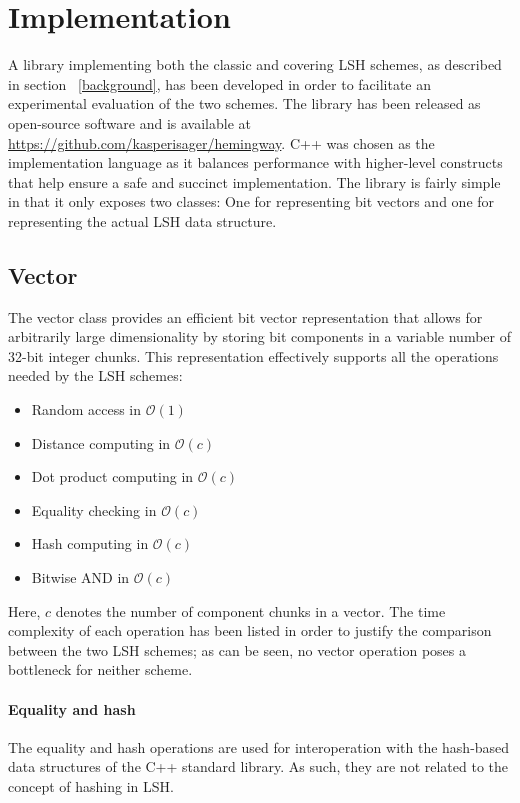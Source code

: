 \section{Implementation}
\label{implementation}

A library implementing both the classic and covering LSH schemes, as described in section ~\ref{background}, has been developed in order to facilitate an experimental evaluation of the two schemes. The library has been released as open-source software and is available at \url{https://github.com/kasperisager/hemingway}. C++ was chosen as the implementation language as it balances performance with higher-level constructs that help ensure a safe and succinct implementation. The library is fairly simple in that it only exposes two classes: One for representing bit vectors and one for representing the actual LSH data structure.

\subsection{Vector}

The vector class provides an efficient bit vector representation that allows for arbitrarily large dimensionality by storing bit components in a variable number of 32-bit integer chunks. This representation effectively supports all the operations needed by the LSH schemes:

\begin{itemize}
  \item Random access in $\mathcal{O}(1)$
  \item Distance computing in $\mathcal{O}(c)$
  \item Dot product computing in $\mathcal{O}(c)$
  \item Equality checking in $\mathcal{O}(c)$
  \item Hash computing in $\mathcal{O}(c)$
  \item Bitwise AND in $\mathcal{O}(c)$
\end{itemize}

Here, $c$ denotes the number of component chunks in a vector. The time complexity of each operation has been listed in order to justify the comparison between the two LSH schemes; as can be seen, no vector operation poses a bottleneck for neither scheme.

\paragraph{Equality and hash} The equality and hash operations are used for interoperation with the hash-based data structures of the C++ standard library. As such, they are not related to the concept of hashing in LSH.

